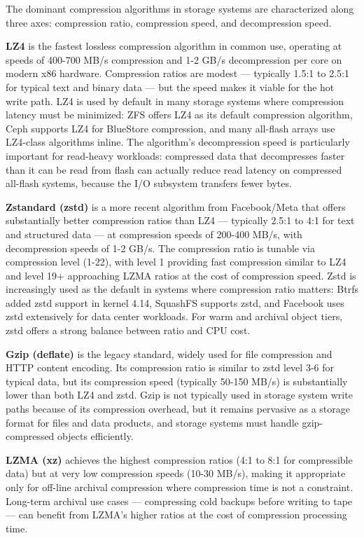The dominant compression algorithms in storage systems are characterized along three axes: compression ratio, compression speed, and decompression speed.

\textbf{LZ4} is the fastest lossless compression algorithm in common use, operating at speeds of 400-700 MB/s compression and 1-2 GB/s decompression per core on modern x86 hardware. Compression ratios are modest --- typically 1.5:1 to 2.5:1 for typical text and binary data --- but the speed makes it viable for the hot write path. LZ4 is used by default in many storage systems where compression latency must be minimized: ZFS offers LZ4 as its default compression algorithm, Ceph supports LZ4 for BlueStore compression, and many all-flash arrays use LZ4-class algorithms inline. The algorithm's decompression speed is particularly important for read-heavy workloads: compressed data that decompresses faster than it can be read from flash can actually reduce read latency on compressed all-flash systems, because the I/O subsystem transfers fewer bytes.

\textbf{Zstandard (zstd)} is a more recent algorithm from Facebook/Meta that offers substantially better compression ratios than LZ4 --- typically 2.5:1 to 4:1 for text and structured data --- at compression speeds of 200-400 MB/s, with decompression speeds of 1-2 GB/s. The compression ratio is tunable via compression level (1-22), with level 1 providing fast compression similar to LZ4 and level 19+ approaching LZMA ratios at the cost of compression speed. Zstd is increasingly used as the default in systems where compression ratio matters: Btrfs added zstd support in kernel 4.14, SquashFS supports zstd, and Facebook uses zstd extensively for data center workloads. For warm and archival object tiers, zstd offers a strong balance between ratio and CPU cost.

\textbf{Gzip (deflate)} is the legacy standard, widely used for file compression and HTTP content encoding. Its compression ratio is similar to zstd level 3-6 for typical data, but its compression speed (typically 50-150 MB/s) is substantially lower than both LZ4 and zstd. Gzip is not typically used in storage system write paths because of its compression overhead, but it remains pervasive as a storage format for files and data products, and storage systems must handle gzip-compressed objects efficiently.

\textbf{LZMA (xz)} achieves the highest compression ratios (4:1 to 8:1 for compressible data) but at very low compression speeds (10-30 MB/s), making it appropriate only for off-line archival compression where compression time is not a constraint. Long-term archival use cases --- compressing cold backups before writing to tape --- can benefit from LZMA's higher ratios at the cost of compression processing time.

